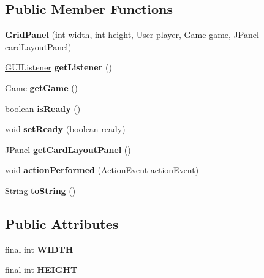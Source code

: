 \subsection*{Public Member Functions}
\begin{DoxyCompactItemize}
\item 
{\bfseries Grid\+Panel} (int width, int height, \hyperlink{classUser}{User} player, \hyperlink{classGame}{Game} game, J\+Panel card\+Layout\+Panel)\hypertarget{classGridPanel_af8bf9b3bb5b5548a39f97371848e0ac7}{}\label{classGridPanel_af8bf9b3bb5b5548a39f97371848e0ac7}

\item 
\hyperlink{classGUIListener}{G\+U\+I\+Listener} {\bfseries get\+Listener} ()\hypertarget{classGridPanel_a297c91de7bf845e66bd2ae03c1635950}{}\label{classGridPanel_a297c91de7bf845e66bd2ae03c1635950}

\item 
\hyperlink{classGame}{Game} {\bfseries get\+Game} ()\hypertarget{classGridPanel_a2eb320db357aef01be7b27ecf045bbbf}{}\label{classGridPanel_a2eb320db357aef01be7b27ecf045bbbf}

\item 
boolean {\bfseries is\+Ready} ()\hypertarget{classGridPanel_aae632b11eaed927afd5884f99a5870f8}{}\label{classGridPanel_aae632b11eaed927afd5884f99a5870f8}

\item 
void {\bfseries set\+Ready} (boolean ready)\hypertarget{classGridPanel_a09c32b26eae81ac799aa95e28aae194f}{}\label{classGridPanel_a09c32b26eae81ac799aa95e28aae194f}

\item 
J\+Panel {\bfseries get\+Card\+Layout\+Panel} ()\hypertarget{classGridPanel_a1a8601fc7d4f8175c7aebd6bec8ec6f9}{}\label{classGridPanel_a1a8601fc7d4f8175c7aebd6bec8ec6f9}

\item 
void {\bfseries action\+Performed} (Action\+Event action\+Event)\hypertarget{classGridPanel_a38f9375b4ed14fa70edaa859b0ed43e6}{}\label{classGridPanel_a38f9375b4ed14fa70edaa859b0ed43e6}

\item 
String {\bfseries to\+String} ()\hypertarget{classGridPanel_a7dbc1ff2bf786538707f479837ce2792}{}\label{classGridPanel_a7dbc1ff2bf786538707f479837ce2792}

\end{DoxyCompactItemize}
\subsection*{Public Attributes}
\begin{DoxyCompactItemize}
\item 
final int {\bfseries W\+I\+D\+TH}\hypertarget{classGridPanel_a0ad964f4019fe73ca89797e3b2ba6801}{}\label{classGridPanel_a0ad964f4019fe73ca89797e3b2ba6801}

\item 
final int {\bfseries H\+E\+I\+G\+HT}\hypertarget{classGridPanel_a1a9b96aea68e7aa0b30ae9663760bb97}{}\label{classGridPanel_a1a9b96aea68e7aa0b30ae9663760bb97}

\end{DoxyCompactItemize}
